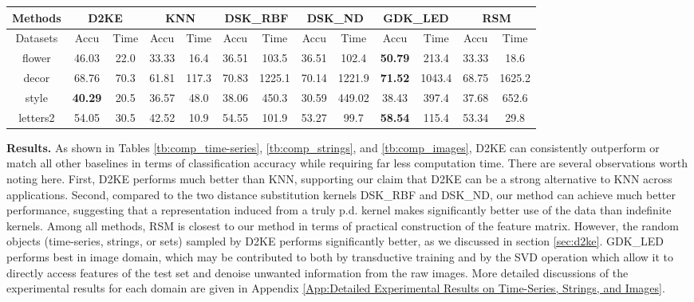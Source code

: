 \documentclass{article}
\newcommand{\1}{\mathbf{1}}
\begin{document}
\begin{table*}[th]
\centering
\caption{Classification performance comparison on images.} 
\label{tb:comp_images}
\scriptsize
\newcommand{\Bd}[1]{\textbf{#1}}
\vspace{-4mm}
\begin{center}
    \begin{tabular}{ c cc cc cc cc cc cc}
    \hline
    \multicolumn{1}{c}{Methods}
    & \multicolumn{2}{c}{D2KE} 
    & \multicolumn{2}{c}{KNN}
    & \multicolumn{2}{c}{DSK\_RBF} 
    & \multicolumn{2}{c}{DSK\_ND} 
    & \multicolumn{2}{c}{GDK\_LED}
    & \multicolumn{2}{c}{RSM} \\ \hline 
	\multicolumn{1}{c}{Datasets} & Accu & Time & Accu & Time & Accu & Time & Accu & Time & Accu & Time & Accu & Time \\ \hline
	flower  & 46.03 & 22.0 & 33.33 & 16.4 & 36.51 & 103.5 & 36.51 & 102.4 & \Bd{50.79} & 213.4 & 33.33 & 18.6\\
	decor & 68.76 & 70.3 & 61.81 & 117.3 & 70.83 & 1225.1 & 70.14 & 1221.9 & \Bd{71.52} & 1043.4 & 68.75 & 1625.2 \\
	style & \Bd{40.29} & 20.5 & 36.57 & 48.0 & 38.06 & 450.3 & 30.59 & 449.02 & 38.43 & 397.4 & 37.68 & 652.6 \\ 
    letters2 & 54.05 & 30.5 & 42.52 & 10.9 & 54.55 & 101.9 & 53.27 & 99.7 & \Bd{58.54} & 115.4 & 53.34 & 29.8 \\ \hline
    \end{tabular}   
\end{center}
\vspace{-2mm}
\end{table*}

\textbf{Results.} As shown in Tables \ref{tb:comp_time-series},  \ref{tb:comp_strings}, and \ref{tb:comp_images}, D2KE can consistently outperform or match all other baselines in terms of classification accuracy while requiring far less computation time. There are several observations worth noting here. First, D2KE performs much better than KNN, supporting our claim that D2KE can be a strong alternative to KNN across applications. Second, compared to the two distance substitution kernels DSK\_RBF and DSK\_ND, our method can achieve much better performance, suggesting that a representation induced from a truly p.d. kernel makes significantly better use of the data than indefinite kernels. Among all methods, RSM is closest to our method in terms of practical construction of the feature matrix. However, the random objects (time-series, strings, or sets) sampled by D2KE performs significantly better, as we discussed in section \ref{sec:d2ke}. GDK\_LED performs best in image domain, which may be contributed to both by transductive training and by the SVD operation which allow it to  directly access features of the test set and denoise unwanted information from the raw images. More detailed discussions of the experimental results for each domain are given in Appendix \ref{App:Detailed Experimental Results on Time-Series, Strings, and Images}.
\end{document}
